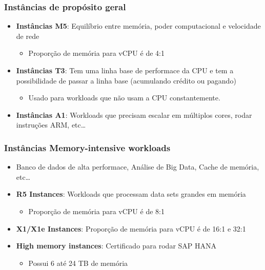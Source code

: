 \begin{frame}
	\frametitle{Instâncias de propósito geral}
	\begin{itemize}
		\item \textbf{Instâncias M5}: Equilíbrio entre memória, poder computacional e velocidade de rede
			\begin{itemize}
				\item Proporção de memória para vCPU é de 4:1
			\end{itemize}
		\item \textbf{Instâncias T3}: Tem uma linha base de performace da CPU e tem a possibilidade de passar a linha base (acumulando crédito ou pagando)
			\begin{itemize}
				\item Usado para workloads que não usam a CPU constantemente.
			\end{itemize}
		\item \textbf{Instâncias A1}: Workloads que precisam escalar em múltiplos cores, rodar instruções ARM, etc\dots
	\end{itemize}
\end{frame}

\begin{frame}
	\frametitle{Instâncias Memory-intensive workloads}
	\begin{itemize}
		\item Banco de dados de alta performace, Análise de Big Data, Cache de memória, etc\dots
		\item \textbf{R5 Instances}: Workloads que processam data sets grandes em memória
			\begin{itemize}
				\item Proporção de memória para vCPU é de 8:1
			\end{itemize}
		\item \textbf{X1/X1e Instances}: Proporção de memória para vCPU é de 16:1 e 32:1
		\item \textbf{High memory instances}: Certificado para rodar SAP HANA
			\begin{itemize}
				\item Possui 6 até 24 TB de memória
			\end{itemize}
	\end{itemize}
\end{frame}

